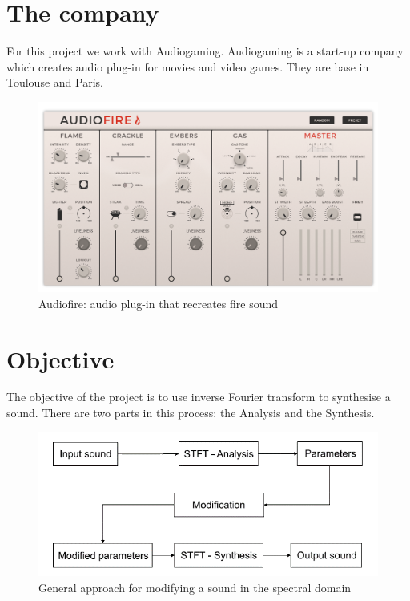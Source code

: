 \documentclass[]{article}
\begin{document}
\section{The company}\label{sec:the-company}
For this project we work with Audiogaming. Audiogaming is a start-up company which creates audio
plug-in for movies and video games. They are base in Toulouse and Paris.
\begin{figure}[H]
	\centering
	\includegraphics[scale=0.19]{AudioFire_screen.png}
	\caption{ Audiofire: audio plug-in that recreates fire sound}
\end{figure}

\section{Objective}\label{sec:objective}

The objective of the project is to use
inverse Fourier transform to synthesise a sound. There are two
parts in this process: the Analysis and the Synthesis.
	\begin{figure}[H]
		\centering
		\includegraphics[scale=0.4]{Analysis_Synthesis.png}
		\caption{ General approach for modifying a sound in the spectral domain}
	\end{figure}
\end{document}

